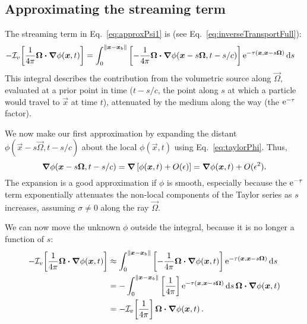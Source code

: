 \subsection{Approximating the streaming term}
The streaming term in Eq.~\eqref{eq:approxPsi1} is (see
Eq.~\eqref{eq:inverseTransportFull}):
\begin{align*}
- \mathcal{I}_{v}\!\left[\frac{1}{4\pi} \bm{\Omega}\bm{\cdot} \bm{\nabla} \phi(\bm{x}, t)\right]
  &= \int_{0}^{\left\| \bm{x} - \bm{x}_b \right\|}
    \left[ -\frac1{4\pi}\bm{\Omega}\bm{\cdot} \bm{\nabla} \phi(\bm{x} - s \bm{\Omega},
    t-s/c)
    \right]
    \mathop{}\!\mathrm{e}^{ -\tau(\bm{x}, \bm{x} - s \bm{\Omega})}
    \mathop{}\!\mathrm{d} s
\end{align*}
This integral describes the contribution from the volumetric source  along
$\vec{\Omega}$, evaluated at a prior
point in time ($t-s/c$, the point along $s$ at which a particle would travel
to $\vec{x}$ at time $t$), attenuated by the medium along the way (the
$\mathop{}\!\mathrm{e}^{ -\tau }$ factor).

We now make our first approximation by expanding the distant $\phi(\vec{x} - s
\vec{\Omega}, t-s/c)$ about the local $\phi(\vec{x}, t)$ using
Eq.~\eqref{eq:taylorPhi}. Thus,
\begin{equation*}
  \bm{\nabla} \phi(\bm{x} - s \bm{\Omega}, t-s/c)
  = \bm{\nabla} \left[ \phi(\bm{x}, t) + O(\epsilon) \right]
  = \bm{\nabla} \phi(\bm{x}, t) + O(\epsilon^2).
\end{equation*}
The expansion is a good approximation if $\phi$ is smooth, especially because the
$\mathop{}\!\mathrm{e}^{ -\tau }$ term exponentially attenuates the non-local components of the
Taylor series as $s$ increases, assuming $\sigma\ne 0$ along the ray
$\vec{\Omega}$.

We can now move the unknown $\phi$ outside the integral,
because it is no longer a function of $s$:
\begin{align}\nonumber
- \mathcal{I}_{v}\!\left[\frac{1}{4\pi} \bm{\Omega}\bm{\cdot} \bm{\nabla} \phi(\bm{x}, t)\right]
  &\approx \int_{0}^{\left\| \bm{x} - \bm{x}_b \right\|}
    \left[ -\frac1{4\pi}\bm{\Omega}\bm{\cdot} \bm{\nabla} \phi(\bm{x},t) \right]
    \mathop{}\!\mathrm{e}^{ -\tau(\bm{x}, \bm{x} - s \bm{\Omega})}
    \mathop{}\!\mathrm{d} s
  \\\nonumber
  &= - \int_{0}^{\left\| \bm{x} - \bm{x}_b \right\|}
    \left[ \frac1{4\pi}\right]
    \mathop{}\!\mathrm{e}^{ -\tau(\bm{x}, \bm{x} - s \bm{\Omega})} \mathop{}\!\mathrm{d} s \,
    \bm{\Omega}\bm{\cdot} \bm{\nabla} \phi(\bm{x},t)
  \\\label{eq:streamingApprox}
  &= - \mathcal{I}_{v}\!\left[ \frac1{4\pi} \right] \bm{\Omega}\bm{\cdot} \bm{\nabla} \phi(\bm{x},t)
  \,.
\end{align}

